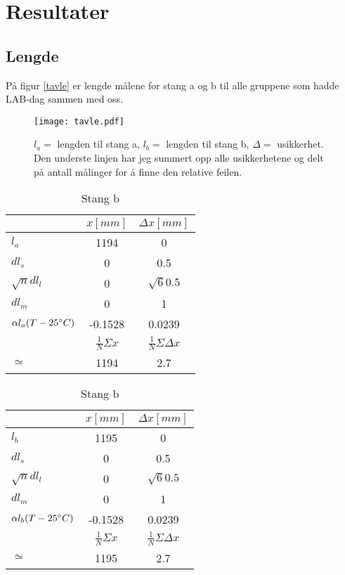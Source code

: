 \documentclass[norsk,a4paper,12pt]{article}
\begin{document}
\newpage
\section{Resultater}

\subsection{Lengde}

På figur \vref{tavle} er lengde målene for stang a og b til alle gruppene som hadde LAB-dag sammen med oss.

\begin{figure}
\begin{center}
  \texttt{[image: tavle.pdf]}\\
  \caption[Alle mål av stang a og b]{$l_a =$ lengden til stang a, $l_b=$ lengden til stang b, $\Delta =$ usikkerhet. Den underste linjen har jeg summert opp alle usikkerhetene og delt på antall målinger for å finne den relative feilen.}
  \label{tavle}
  \end{center}
\end{figure}

\begin{table}
\caption{\textbf{Mål av stang a og stang b med meterstokk}}
	\begin{minipage}{.5\linewidth}
	\centering
	\caption{Stang a}
		\begin{tabular}{|l|c|c|}
		\hline
		&$x[mm]$ &$\Delta x [mm]$ \\ \hline
		$l_a$&1194 &0\\
		$dl_s$&0 &0.5\\
		$\sqrt{n}dl_l$&0 &$\sqrt{6}0.5$\\
		$dl_m$&0 &1\\
		$\alpha l_a(T-25\text{\degree}C)$& -0.1528&0.0239\\ \hline
		&$\frac{1}{N}\Sigma x$&$\frac{1}{N}\Sigma \Delta x$\\ \hline
		$\simeq$&1194 & 2.7 \\ 
		\hline
		\end{tabular}
	\label{meterstokka}
	\end{minipage}
	\begin{minipage}{.5\linewidth}
	\centering
	\caption{Stang b}
		\begin{tabular}{|l|c|c|}
		\hline
		&$x[mm]$ &$\Delta x [mm]$ \\ \hline
		$l_b$&1195 &0\\
		$dl_s$&0 &0.5\\
		$\sqrt{n}dl_l$&0 &$\sqrt{6}0.5$\\
		$dl_m$&0 &1\\
		$\alpha l_b(T-25\text{\degree}C)$& -0.1528&0.0239\\ \hline
		&$\frac{1}{N}\Sigma x$&$\frac{1}{N}\Sigma \Delta x$\\ \hline
		$\simeq$&1195 & 2.7 \\ 
		\hline
		\end{tabular}
	\label{meterstokkb}
	\end{minipage}
\end{table}
\end{document}
